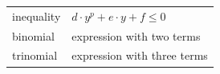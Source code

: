 {\begin{tabular}[t]{|l|l|}
     \tabularnewline\cline{1-1}\cline{2-2}
        inequality &
                  $d\ensuremath{\cdot}{y}^{p}+e\ensuremath{\cdot}y+f\le 0$
     \tabularnewline\cline{1-1}\cline{2-2}
        binomial &
        expression with two terms%
     \tabularnewline\cline{1-1}\cline{2-2}
        trinomial &
        expression with three terms%
     \tabularnewline\cline{1-1}\cline{2-2}
    \end{tabular}} %
        \addtolength{\mytableboxheight}{\mytableboxdepth}
